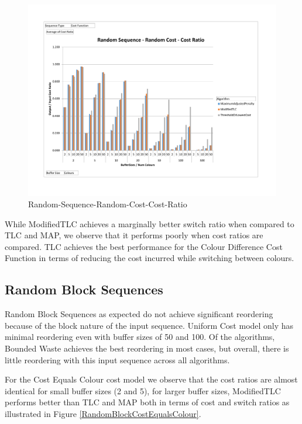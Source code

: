 \begin{figure}[ht]
\centering 
\includegraphics[scale=0.60]{Random-Seq-Random-Cost.pdf}
\caption{Random-Sequence-Random-Cost-Cost-Ratio}
\label{RandomSeqRandomCost}
\end{figure}

While ModifiedTLC achieves a marginally better switch ratio when compared to TLC and MAP, we observe that it performs poorly when cost ratios are compared. TLC achieves the best performance for the Colour Difference Cost Function in terms of reducing the cost incurred while switching between colours. 

\subsection{Random Block Sequences}

Random Block Sequences as expected do not achieve significant reordering because of the block nature of the input sequence. Uniform Cost model only has minimal reordering even with buffer sizes of 50 and 100. Of the algorithms, Bounded Waste achieves the best reordering in most cases, but overall, there is little reordering with this input sequence across all algorithms.

For the Cost Equals Colour cost model we observe that the cost ratios are almost identical for small buffer sizes (2 and 5), for larger buffer sizes, ModifiedTLC performs better than TLC and MAP both in terms of cost and switch ratios as illustrated in Figure \ref{RandomBlockCostEqualsColour}.

